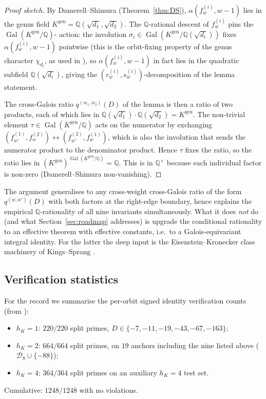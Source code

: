 \documentclass[11pt,a4paper]{amsart}
\theoremstyle{plain}
\theoremstyle{definition}
\DeclareMathOperator{\Gal}{Gal}
\newcommand{\Q}{\mathbb{Q}}
\newcommand{\fl}[2]{f_{#1}^{(#2)}}
\newcommand{\qstr}[2]{q^{(#1,#2)}}
\begin{document}
\begin{proof}[Proof sketch]
By Damerell--Shimura (Theorem~\ref{thm:DS}), $\alpha(\fl{w}{i}, w-1)$ lies
in the genus field $K^{\mathrm{gen}} = \Q(\sqrt{d_1}, \sqrt{d_2})$. The
$\Q$-rational descent of $\fl{w}{i}$ pins the $\Gal(K^{\mathrm{gen}}/\Q)$-
action: the involution
$\sigma_i\in\Gal(K^{\mathrm{gen}}/\Q(\sqrt{d_i}))$ fixes
$\alpha(\fl{w}{i}, w-1)$ pointwise (this is the orbit-fixing property of
the genus character $\chi_{d_i}$, as used in
\cite[\S 6]{Cox1989}), so $\alpha(\fl{w}{i}, w-1)$ in fact lies in the
quadratic subfield $\Q(\sqrt{d_i})$, giving the
$(r_w^{(i)}, s_w^{(i)})$-decomposition of the lemma statement.

The cross-Galois ratio $\qstr{w_1}{w_2}(D)$ of the lemma is then a ratio of
two products, each of which lies in
$\Q(\sqrt{d_1})\cdot\Q(\sqrt{d_2}) = K^{\mathrm{gen}}$. The non-trivial element
$\tau\in\Gal(K^{\mathrm{gen}}/\Q)$ acts on the numerator by exchanging
$(\fl{w'}{1}, \fl{w}{2})\leftrightarrow (\fl{w'}{2}, \fl{w}{1})$, which is
also the involution that sends the numerator product to the denominator
product. Hence $\tau$ fixes the ratio, so the ratio lies in
$(K^{\mathrm{gen}})^{\Gal(K^{\mathrm{gen}}/\Q)} = \Q$. This is in $\Q^{\times}$
because each individual factor is non-zero
(Damerell--Shimura non-vanishing).
\end{proof}

The argument generalises to any cross-weight cross-Galois ratio of the form
$\qstr{w}{w'}(D)$ with both factors at the right-edge boundary, hence
explains the empirical $\Q$-rationality of all nine invariants
simultaneously. What it does \emph{not} do (and what
Section~\ref{sec:roadmap} addresses) is upgrade the conditional rationality
to an effective theorem with effective constants, i.e.\ to a
Galois-equivariant integral identity. For the latter the deep input is
the Eisenstein--Kronecker class machinery of Kings--Sprang
\cite{KingsSprang2025}.

\subsection{Verification statistics}\label{ss:verif}

For the record we summarise the per-orbit signed identity verification
counts (from \cite[OP-NEWTON-DICKSON-SIGNED]{Remondiere2026ND}):
\begin{itemize}
\item $h_K = 1$: $220/220$ split primes, $D \in \{-7,-11,-19,-43,-67,-163\}$;
\item $h_K = 2$: $664/664$ split primes, on $19$ anchors including
the nine listed above ($\mathcal{D}_8 \cup \{-88\}$);
\item $h_K = 4$: $364/364$ split primes on an auxiliary $h_K = 4$ test set.
\end{itemize}
Cumulative: $1248/1248$ with no violations.
\end{document}
